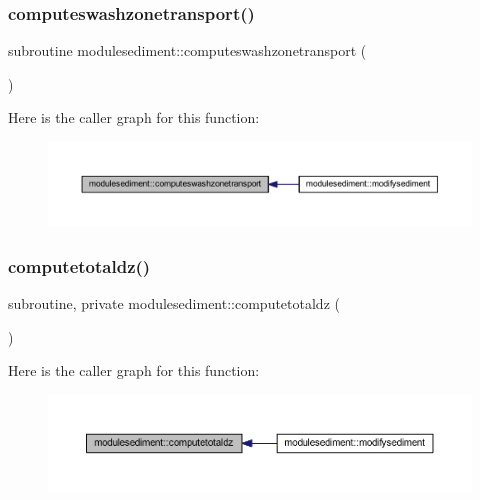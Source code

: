 \subsubsection{\texorpdfstring{computeswashzonetransport()}{computeswashzonetransport()}}
{\footnotesize\ttfamily subroutine modulesediment\+::computeswashzonetransport (\begin{DoxyParamCaption}{ }\end{DoxyParamCaption})\hspace{0.3cm}{\ttfamily [private]}}

Here is the caller graph for this function\+:\nopagebreak
\begin{figure}[H]
\begin{center}
\leavevmode
\includegraphics[width=350pt]{namespacemodulesediment_a0fc734d1e2e7bacc8606e169d198ead5_icgraph}
\end{center}
\end{figure}
\mbox{\label{namespacemodulesediment_a9aa4c5d236de77268f5aa5b54dfdab36}} 
\subsubsection{\texorpdfstring{computetotaldz()}{computetotaldz()}}
{\footnotesize\ttfamily subroutine, private modulesediment\+::computetotaldz (\begin{DoxyParamCaption}{ }\end{DoxyParamCaption})\hspace{0.3cm}{\ttfamily [private]}}

Here is the caller graph for this function\+:\nopagebreak
\begin{figure}[H]
\begin{center}
\leavevmode
\includegraphics[width=350pt]{namespacemodulesediment_a9aa4c5d236de77268f5aa5b54dfdab36_icgraph}
\end{center}
\end{figure}
\mbox{\label{namespacemodulesediment_ae2d0c9fdf078f2fd81047486eb734a9d}} 
